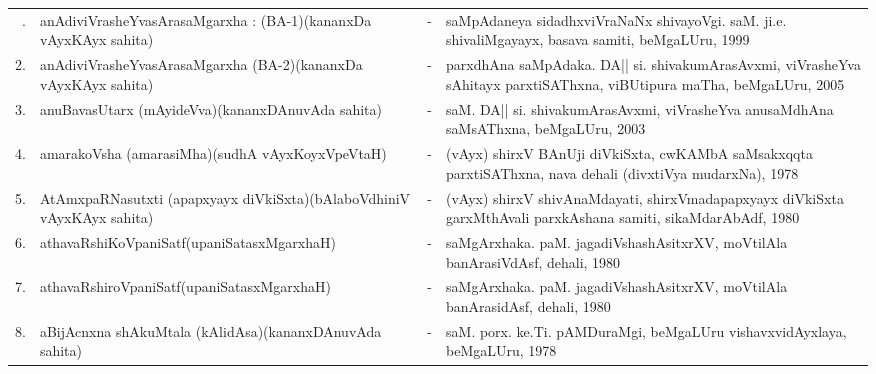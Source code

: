 {\renewcommand{\arraystretch}{1.3}
\begin{longtable}{rp{6cm}cp{9cm}<{\raggedright}}
\hline
\endfirsthead
\hline
\endhead
\hline
\endfoot
\endlastfoot
1. & anAdiviVrasheYvasArasaMgarxha : (BA-1)\newline (kananxDa vAyxKAyx sahita) &-& saMpAdaneya sidadhxviVraNaNx shivayoVgi. saM. ji.e. shivaliMgayayx, basava samiti, beMgaLUru, 1999\\
2. & anAdiviVrasheYvasArasaMgarxha (BA-2)\newline (kananxDa vAyxKAyx sahita) &-& parxdhAna saMpAdaka. DA|| si. shivakumArasAvxmi, viVrasheYva sAhitayx parxtiSAThxna, viBUtipura maTha, beMgaLUru, 2005\\
3. & anuBavasUtarx (mAyideVva)\newline (kananxDAnuvAda sahita) &-& saM. DA|| si. shivakumArasAvxmi, viVrasheYva anusaMdhAna saMsAThxna, beMgaLUru, 2003\\
4. & amarakoVsha (amarasiMha)\newline (sudhA vAyxKoyxVpeVtaH) &-& (vAyx) shirxV BAnUji diVkiSxta, cwKAMbA saMsakxqqta parxtiSAThxna, nava dehali (divxtiVya mudarxNa), 1978\\
5. & AtAmxpaRNasutxti (apapxyayx diVkiSxta)\newline (bAlaboVdhiniV vAyxKAyx sahita) &-& (vAyx) shirxV shivAnaMdayati, shirxVmadapapxyayx diVkiSxta garxMthAvali parxkAshana samiti, sikaMdarAbAdf, 1980\\
6. & athavaRshiKoVpaniSatf\newline (upaniSatasxMgarxhaH) &-& saMgArxhaka. paM. jagadiVshashAsitxrXV, moVtilAla banArasiVdAsf, dehali, 1980\\
7. & athavaRshiroVpaniSatf\newline (upaniSatasxMgarxhaH) &-& saMgArxhaka. paM. jagadiVshashAsitxrXV, moVtilAla banArasidAsf, dehali, 1980\\
8. & aBijAcnxna shAkuMtala (kAlidAsa)\newline (kananxDAnuvAda sahita) &-& saM. porx. ke.Ti. pAMDuraMgi, beMgaLUru vishavxvidAyxlaya, beMgaLUru, 1978\\

\end{longtable}}
